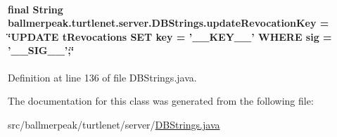 \hypertarget{classballmerpeak_1_1turtlenet_1_1server_1_1DBStrings_a39d82ab9d47622f3d106772a81171a1d}{
\paragraph[{update\-Revocation\-Key}]{\setlength{\rightskip}{0pt plus 5cm}final String ballmerpeak.\-turtlenet.\-server.\-D\-B\-Strings.\-update\-Revocation\-Key = \char`\"{}U\-P\-D\-A\-T\-E t\-Revocations S\-E\-T key = '\-\_\-\-\_\-\-K\-E\-Y\-\_\-\-\_\-' W\-H\-E\-R\-E sig = '\-\_\-\-\_\-\-S\-I\-G\-\_\-\-\_\-';\char`\"{}\hspace{0.3cm}{\ttfamily [static]}}}\label{classballmerpeak_1_1turtlenet_1_1server_1_1DBStrings_a39d82ab9d47622f3d106772a81171a1d}


Definition at line 136 of file D\-B\-Strings.\-java.



The documentation for this class was generated from the following file\-:\begin{DoxyCompactItemize}
\item 
src/ballmerpeak/turtlenet/server/\hyperlink{DBStrings_8java}{D\-B\-Strings.\-java}\end{DoxyCompactItemize}
